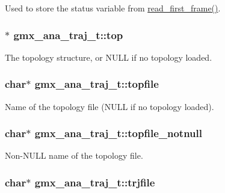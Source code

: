 \-Used to store the status variable from \hyperlink{include_2statutil_8h_adc4f33e386a5eb2a1788c92cf994c1b9}{read\-\_\-first\-\_\-frame()}. \hypertarget{structgmx__ana__traj__t_a49e2e4d714fb70040167126a6eb6b0d0}{
\subsubsection[{top}]{$\ast$ {\bf gmx\-\_\-ana\-\_\-traj\-\_\-t\-::top}}}\label{structgmx__ana__traj__t_a49e2e4d714fb70040167126a6eb6b0d0}
\-The topology structure, or {\ttfamily \-N\-U\-L\-L} if no topology loaded. \hypertarget{structgmx__ana__traj__t_a8ff9778535f8cdc0754879a13658b986}{
\subsubsection[{topfile}]{\setlength{\rightskip}{0pt plus 5cm}char$\ast$ {\bf gmx\-\_\-ana\-\_\-traj\-\_\-t\-::topfile}}}\label{structgmx__ana__traj__t_a8ff9778535f8cdc0754879a13658b986}
\-Name of the topology file (\-N\-U\-L\-L if no topology loaded). \hypertarget{structgmx__ana__traj__t_ab05a04129753cb7d7667fd3a3f5da8f4}{
\subsubsection[{topfile\-\_\-notnull}]{\setlength{\rightskip}{0pt plus 5cm}char$\ast$ {\bf gmx\-\_\-ana\-\_\-traj\-\_\-t\-::topfile\-\_\-notnull}}}\label{structgmx__ana__traj__t_ab05a04129753cb7d7667fd3a3f5da8f4}
\-Non-\/\-N\-U\-L\-L name of the topology file. \hypertarget{structgmx__ana__traj__t_a2d8ce4fe5e33a342e8d0d874653dead7}{
\subsubsection[{trjfile}]{\setlength{\rightskip}{0pt plus 5cm}char$\ast$ {\bf gmx\-\_\-ana\-\_\-traj\-\_\-t\-::trjfile}}}\label{structgmx__ana__traj__t_a2d8ce4fe5e33a342e8d0d874653dead7}
